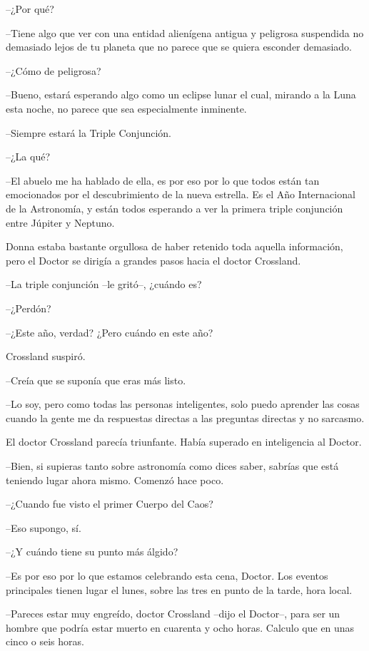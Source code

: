 --¿Por qué?

--Tiene algo que ver con una entidad alienígena antigua y peligrosa
suspendida no demasiado lejos de tu planeta que no parece que se quiera
esconder demasiado.

--¿Cómo de peligrosa?

--Bueno, estará esperando algo como un eclipse lunar el cual, mirando a
la Luna esta noche, no parece que sea especialmente inminente.

--Siempre estará la Triple Conjunción.

--¿La qué?

--El abuelo me ha hablado de ella, es por eso por lo que todos están tan
emocionados por el descubrimiento de la nueva estrella. Es el Año
Internacional de la Astronomía, y están todos esperando a ver la primera
triple conjunción entre Júpiter y Neptuno.

Donna estaba bastante orgullosa de haber retenido toda aquella
información, pero el Doctor se dirigía a grandes pasos hacia el doctor
Crossland.

--La triple conjunción --le gritó--, ¿cuándo es?

--¿Perdón?

--¿Este año, verdad? ¿Pero cuándo en este año?

Crossland suspiró.

--Creía que se suponía que eras más listo.

--Lo soy, pero como todas las personas inteligentes, solo puedo aprender
las cosas cuando la gente me da respuestas directas a las preguntas
directas y no sarcasmo.

El doctor Crossland parecía triunfante. Había superado en inteligencia
al Doctor.

--Bien, si supieras tanto sobre astronomía como dices saber, sabrías que
está teniendo lugar ahora mismo. Comenzó hace poco.

--¿Cuando fue visto el primer Cuerpo del Caos?

--Eso supongo, sí.

--¿Y cuándo tiene su punto más álgido?

--Es por eso por lo que estamos celebrando esta cena, Doctor. Los
eventos principales tienen lugar el lunes, sobre las tres en punto de la
tarde, hora local.

--Pareces estar muy engreído, doctor Crossland --dijo el Doctor--, para
ser un hombre que podría estar muerto en cuarenta y ocho horas. Calculo
que en unas cinco o seis horas.

